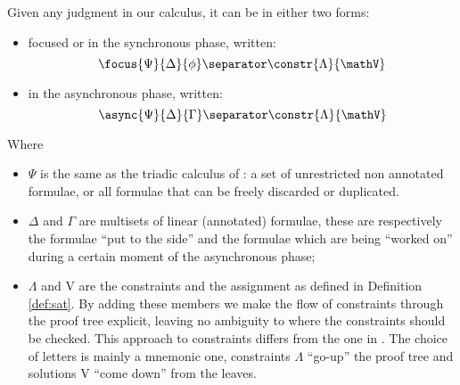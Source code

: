 \begin{define}
	Given any judgment in our calculus, it can be in either two forms:
	\begin{itemize}
		\item focused or in the synchronous phase, written:
			$$\focus{\Psi}{\Delta}{\phi} \separator \constr{\Lambda}{\mathV}$$
		\item in the asynchronous phase, written:
			$$\async{\Psi}{\Delta}{\Gamma} \separator \constr{\Lambda}{\mathV}$$
	\end{itemize}
	Where 
	\begin{itemize}
		\item $\Psi$ is the same as the triadic calculus of \cite{Focusing}: a set of unrestricted non annotated formulae, or all formulae that can be freely discarded or duplicated.
		\item $\Delta$ and $\Gamma$ are multisets of linear (annotated) formulae, these are respectively the formulae ``put to the side'' and the formulae which are being ``worked on'' during a certain moment of the asynchronous phase;
		\item $\Lambda$ and V are the constraints and the assignment as defined in Definition \ref{def:sat}.
			By adding these members we make the flow of constraints through the proof tree explicit, leaving no ambiguity to where the constraints should be checked.
			This approach to constraints differs from the one in \cite{HarlandPym}.
			The choice of letters is mainly a mnemonic one, constraints $\Lambda$ ``go-up'' the proof tree and solutions V ``come down'' from the leaves.
	\end{itemize}
\end{define}

